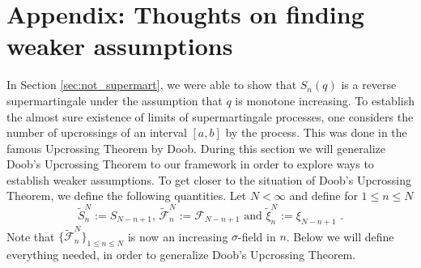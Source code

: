 \documentclass[phd]{UWMThesis}
\newcommand{\F}{\mathcal{F}}
\newcommand{\sn}[1]{S_{#1}}
\newcommand{\StN}[1]{\tilde{S}_{#1}^N}
\newcommand{\FtN}[1]{\tilde{\F}_{#1}^N}
\newcommand{\xitN}[1]{\tilde{\xi}_{#1}^N}
\newcommand{\mdot}{\textrm{ .}}
\renewcommand{\.}{\textrm{ .}}
\theoremstyle{definition}
\numberwithin{thm}{chapter}
\begin{document}
\chapter*{Appendix: Thoughts on finding weaker assumptions}
In Section \ref{sec:not_supermart}, we were able to show that $S_n(q)$ is a reverse supermartingale under the assumption that $q$ is monotone increasing. To establish the almost sure existence of limits of supermartingale processes, one considers the number of upcrossings of an interval $[a,b]$ by the process. This was done in the famous Upcrossing Theorem by Doob. During this section we will generalize Doob's Upcrossing Theorem to our framework in order to explore ways to establish weaker assumptions. To get closer to the situation of Doob's Upcrossing Theorem, we define the following quantities. Let $N<\infty$ and define for $1\leq n\leq N$ 
\begin{equation*}
\StN{n} := \sn{N-n+1} \textrm{, } \FtN{n} := \F_{N-n+1} \textrm{ \ and \ } \xitN{n} := \xi_{N-n+1}\mdot
\end{equation*}
Note that $\{\FtN{n}\}_{1\leq n\leq N}$ is now an increasing $\sigma$-field in $n$.
%
Below we will define everything needed, in order to generalize Doob's Upcrossing Theorem.
\end{document}
